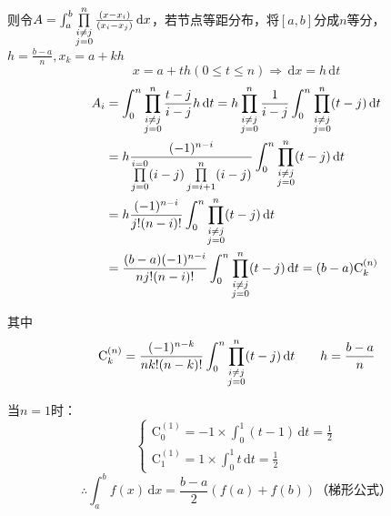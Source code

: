 \documentclass[UTF8,a4paper,11pt,oneside]{ctexbook}
\begin{document}
则令\(A=\int_a^b\prod\limits_{\begin{subarray}{c}
    i\neq j\\
    j=0
\end{subarray}}^n\frac{(x-x_i)}{(x_i-x_j)}\,\mathrm{d}x\)，若节点等距分布，将\([a,b]\)分成\(n\)等分，\(h=\frac{b-a}{n},x_k=a+kh\)
\[
x=a+th(0\leq t\leq n)\Rightarrow\,\mathrm{d}x=h\,\mathrm{d}t
\]
\begin{align*}
    A_i & =\int_0^n\prod_{\begin{subarray}{c}
        i\neq j\\
        j=0
    \end{subarray}}^n\frac{t-j}{i-j}h\,\mathrm{d}t=h\prod_{\begin{subarray}{c}
        i\neq j\\
        j=0
    \end{subarray}}^n\frac{1}{i-j}\int_0^n\prod_{\begin{subarray}{c}
        i\neq j\\
        j=0
    \end{subarray}}^n(t-j)\,\mathrm{d}t\\
     & =h\frac{(-1)^{n-i}}{\prod\limits_{j=0}^{i=0}(i-j)\prod\limits_{j=i+1}^n(i-j)}\int_0^n\prod_{\begin{subarray}{c}
        i\neq j\\
        j=0
    \end{subarray}}^n(t-j)\,\mathrm{d}t\\
    & =h\frac{(-1)^{n-i}}{j!(n-i)!}\int_0^n\prod_{\begin{subarray}{c}
        i\neq j\\
        j=0
    \end{subarray}}^n(t-j)\,\mathrm{d}t\\
    & =\frac{(b-a)(-1)^{n-i}}{nj!(n-i)!}\int_0^n\prod_{\begin{subarray}{c}
        i\neq j\\
        j=0
    \end{subarray}}^n(t-j)\,\mathrm{d}t=(b-a)\mathrm{C}_k^{(n)}
\end{align*}

其中
\[
\mathrm{C}_k^{(n)}=\frac{(-1)^{n-k}}{nk!(n-k)!}\int_0^n\prod_{\begin{subarray}{c}
    i\neq j\\
    j=0
\end{subarray}}^n(t-j)\,\mathrm{d}t\qquad h=\frac{b-a}{n}
\]

当\(n=1\)时：
\[
\begin{cases}
    \mathrm{C}_0^{(1)}=-1\times\int_0^1(t-1)\,\mathrm{d}t=\frac{1}{2}\\
    \mathrm{C}_1^{(1)}=1\times\int_0^1t\,\mathrm{d}t=\frac{1}{2}
\end{cases}
\]
\[
\therefore \int_a^bf(x)\,\mathrm{d}x=\frac{b-a}{2}(f(a)+f(b))\text{（梯形公式）}
\]
\end{document}
